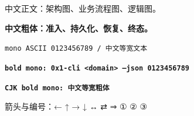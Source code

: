\documentclass[11pt]{article}
\begin{document}
中文正文：架构图、业务流程图、逻辑图。\par
\textbf{中文粗体：准入、持久化、恢复、终态。}\par
\texttt{mono ASCII 0123456789 / 中文等宽文本}\par
\textbf{\texttt{bold mono: 0x1-cli <domain> --json 0123456789}}\par
\textbf{\texttt{CJK bold mono: 中文等宽粗体}}\par
箭头与编号：← ↑ → ↓ ↔ ⇄ ⇒ ① ② ③
\end{document}

